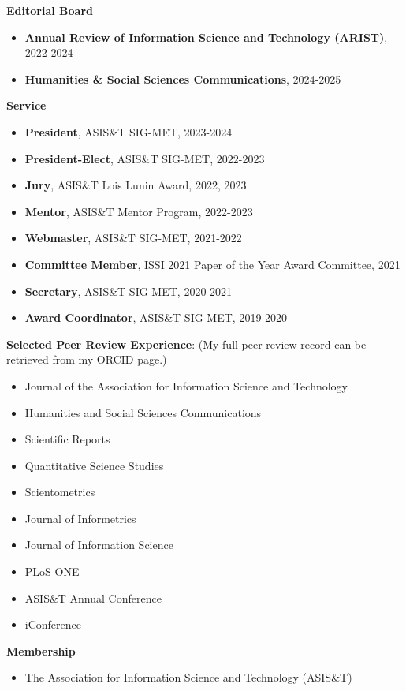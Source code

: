 \documentclass[margin, 10pt]{res} %
\begin{document}
\begin{resume}
\textbf{Editorial Board}
\begin{itemize}
\item \textbf{Annual Review of Information Science and Technology (ARIST)}, 2022-2024
\item \textbf{Humanities \& Social Sciences Communications}, 2024-2025
\end{itemize}

\textbf{Service}
\begin{itemize}
\item \textbf{President}, ASIS\&T SIG-MET, 2023-2024
\item \textbf{President-Elect}, ASIS\&T SIG-MET, 2022-2023
\item \textbf{Jury}, ASIS\&T Lois Lunin Award, 2022, 2023
\item \textbf{Mentor}, ASIS\&T Mentor Program, 2022-2023
\item \textbf{Webmaster}, ASIS\&T SIG-MET, 2021-2022
\item \textbf{Committee Member}, ISSI 2021 Paper of the Year Award Committee, 2021
\item \textbf{Secretary}, ASIS\&T SIG-MET, 2020-2021
\item \textbf{Award Coordinator}, ASIS\&T SIG-MET, 2019-2020
\end{itemize}

\textbf{Selected Peer Review Experience}:  
(My full peer review record can be retrieved from my ORCID page.)

\begin{itemize}
\item Journal of the Association for Information Science and Technology
\item Humanities and Social Sciences Communications
\item Scientific Reports
\item Quantitative Science Studies
\item Scientometrics
\item Journal of Informetrics
\item Journal of Information Science
\item PLoS ONE
\item ASIS\&T Annual Conference
\item iConference 
\end{itemize}

\textbf{Membership}
\begin{itemize}
\item The Association for Information Science and Technology (ASIS\&T)
\end{itemize}


\end{resume}
\end{document}
